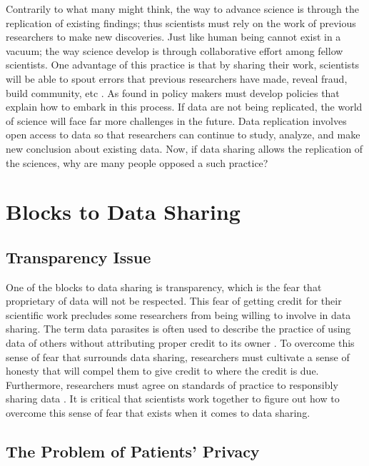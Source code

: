 \documentclass[sigconf]{acmart}
\begin{document}
Contrarily to what many might think, the way to advance science is through the replication of existing findings; thus scientists must rely on the work of previous researchers to make new discoveries. Just like human being cannot exist in a vacuum; the way science develop is through collaborative effort among fellow scientists. One advantage of this practice is that by sharing their work, scientists will be able to spout errors that previous researchers have made, reveal fraud, build community, etc \cite{leetaru2016}. As found in \cite{borgman2012conundrum} policy makers must develop policies that explain how to embark in this process. If data are not being replicated, the world of science will face far more challenges in the future. Data replication involves open access to data so that researchers can continue to study, analyze, and make new conclusion about existing data. Now, if data sharing allows the replication of the sciences, why are many people opposed a such practice? 



\section{Blocks to Data Sharing}

\subsection{Transparency Issue}

One of the blocks to data sharing is transparency, which is the fear that proprietary of data will not be respected. This fear of getting credit for their scientific work precludes some researchers from being willing to involve in data sharing. The term data parasites is often used to describe the practice of using data of others without attributing proper credit to its owner \cite{leetaru2016}. To overcome this sense of fear that surrounds data sharing, researchers must cultivate a sense of honesty that will compel them to give credit to where the credit is due. Furthermore, researchers must agree on standards of practice to responsibly sharing data \cite{borgman2012conundrum}.  It is critical that scientists work together to figure out how to overcome this sense of fear that exists when it comes to data sharing. 

\subsection{The Problem of Patients' Privacy}
\end{document}
